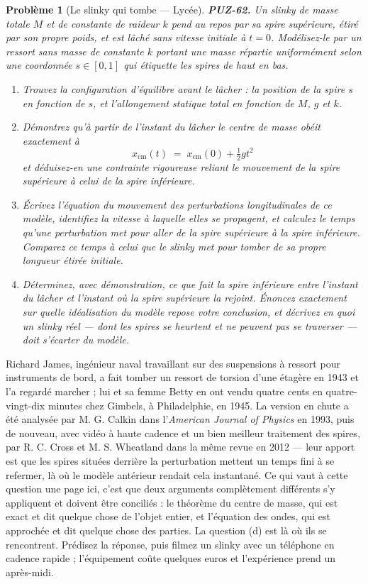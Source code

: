 \documentclass[11pt]{article}
\newtheorem{problem}{Problème}
\begin{document}
\begin{problem}[{Le slinky qui tombe --- Lycée}]
\textbf{PUZ-62.} Un slinky de masse totale $ M $ et de constante de raideur $ k $ pend
au repos par sa spire supérieure, étiré par son propre poids, et est lâché sans vitesse
initiale à $ t = 0 $. Modélisez-le par un ressort sans masse de constante $ k $ portant
une masse répartie uniformément selon une coordonnée $ s \in [0,1] $ qui étiquette les
spires de haut en bas.
\begin{enumerate}
\item[(a)] Trouvez la configuration d'équilibre avant le lâcher : la position de la spire $ s $
en fonction de $ s $, et l'allongement statique total en fonction de $ M $, $ g $ et
$ k $.
\item[(b)] Démontrez qu'à partir de l'instant du lâcher le centre de masse obéit exactement à
\[ x_{\mathrm{cm}}(t) \;=\; x_{\mathrm{cm}}(0) + \tfrac{1}{2} g t^{2} \]
et déduisez-en une contrainte rigoureuse reliant le mouvement de la spire supérieure à celui
de la spire inférieure.
\item[(c)] Écrivez l'équation du mouvement des perturbations longitudinales de ce modèle,
identifiez la vitesse à laquelle elles se propagent, et calculez le temps qu'une
perturbation met pour aller de la spire supérieure à la spire inférieure. Comparez ce temps
à celui que le slinky met pour tomber de sa propre longueur étirée initiale.
\item[(d)] Déterminez, avec démonstration, ce que fait la spire inférieure entre l'instant du
lâcher et l'instant où la spire supérieure la rejoint. Énoncez exactement sur quelle
idéalisation du modèle repose votre conclusion, et décrivez en quoi un slinky réel --- dont
les spires se heurtent et ne peuvent pas se traverser --- doit s'écarter du modèle.
\end{enumerate}

\end{problem}

\noindent Richard James, ingénieur naval travaillant sur des suspensions à ressort
pour instruments de bord, a fait tomber un ressort de torsion d'une étagère en 1943 et l'a
regardé marcher ; lui et sa femme Betty en ont vendu quatre cents en quatre-vingt-dix
minutes chez Gimbels, à Philadelphie, en 1945. La version en chute a été analysée par M. G.
Calkin dans l'\textit{American Journal of Physics} en 1993, puis de nouveau, avec vidéo à
haute cadence et un bien meilleur traitement des spires, par R. C. Cross et M. S. Wheatland
dans la même revue en 2012 --- leur apport est que les spires situées derrière la perturbation
mettent un temps fini à se refermer, là où le modèle antérieur rendait cela instantané. Ce
qui vaut à cette question une page ici, c'est que deux arguments complètement différents s'y
appliquent et doivent être conciliés : le théorème du centre de masse, qui est exact et dit
quelque chose de l'objet entier, et l'équation des ondes, qui est approchée et dit quelque
chose des parties. La question (d) est là où ils se rencontrent. Prédisez la réponse, puis
filmez un slinky avec un téléphone en cadence rapide ; l'équipement coûte quelques euros et
l'expérience prend un après-midi.
\end{document}
